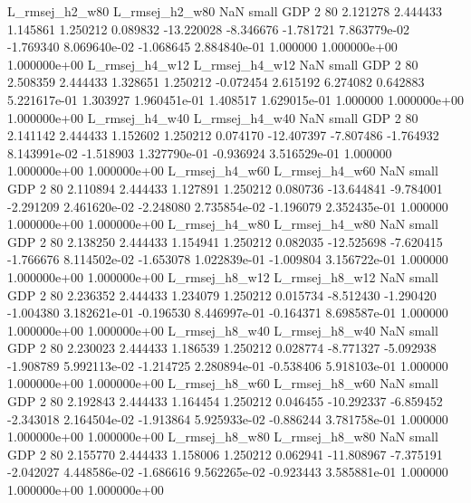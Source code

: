 L_rmsej_h2_w80 L_rmsej_h2_w80                   NaN      small      GDP                 2 80 2.121278       2.444433 1.145861       1.250212    0.089832    -13.220028     -8.346676    -1.781721   7.863779e-02 -1.769340 8.069640e-02    -1.068645   2.884840e-01            1.000000    1.000000e+00        1.000000e+00
L_rmsej_h4_w12 L_rmsej_h4_w12                   NaN      small      GDP                 2 80 2.508359       2.444433 1.328651       1.250212   -0.072454      2.615192      6.274082     0.642883   5.221617e-01  1.303927 1.960451e-01     1.408517   1.629015e-01            1.000000    1.000000e+00        1.000000e+00
L_rmsej_h4_w40 L_rmsej_h4_w40                   NaN      small      GDP                 2 80 2.141142       2.444433 1.152602       1.250212    0.074170    -12.407397     -7.807486    -1.764932   8.143991e-02 -1.518903 1.327790e-01    -0.936924   3.516529e-01            1.000000    1.000000e+00        1.000000e+00
L_rmsej_h4_w60 L_rmsej_h4_w60                   NaN      small      GDP                 2 80 2.110894       2.444433 1.127891       1.250212    0.080736    -13.644841     -9.784001    -2.291209   2.461620e-02 -2.248080 2.735854e-02    -1.196079   2.352435e-01            1.000000    1.000000e+00        1.000000e+00
L_rmsej_h4_w80 L_rmsej_h4_w80                   NaN      small      GDP                 2 80 2.138250       2.444433 1.154941       1.250212    0.082035    -12.525698     -7.620415    -1.766676   8.114502e-02 -1.653078 1.022839e-01    -1.009804   3.156722e-01            1.000000    1.000000e+00        1.000000e+00
L_rmsej_h8_w12 L_rmsej_h8_w12                   NaN      small      GDP                 2 80 2.236352       2.444433 1.234079       1.250212    0.015734     -8.512430     -1.290420    -1.004380   3.182621e-01 -0.196530 8.446997e-01    -0.164371   8.698587e-01            1.000000    1.000000e+00        1.000000e+00
L_rmsej_h8_w40 L_rmsej_h8_w40                   NaN      small      GDP                 2 80 2.230023       2.444433 1.186539       1.250212    0.028774     -8.771327     -5.092938    -1.908789   5.992113e-02 -1.214725 2.280894e-01    -0.538406   5.918103e-01            1.000000    1.000000e+00        1.000000e+00
L_rmsej_h8_w60 L_rmsej_h8_w60                   NaN      small      GDP                 2 80 2.192843       2.444433 1.164454       1.250212    0.046455    -10.292337     -6.859452    -2.343018   2.164504e-02 -1.913864 5.925933e-02    -0.886244   3.781758e-01            1.000000    1.000000e+00        1.000000e+00
L_rmsej_h8_w80 L_rmsej_h8_w80                   NaN      small      GDP                 2 80 2.155770       2.444433 1.158006       1.250212    0.062941    -11.808967     -7.375191    -2.042027   4.448586e-02 -1.686616 9.562265e-02    -0.923443   3.585881e-01            1.000000    1.000000e+00        1.000000e+00
